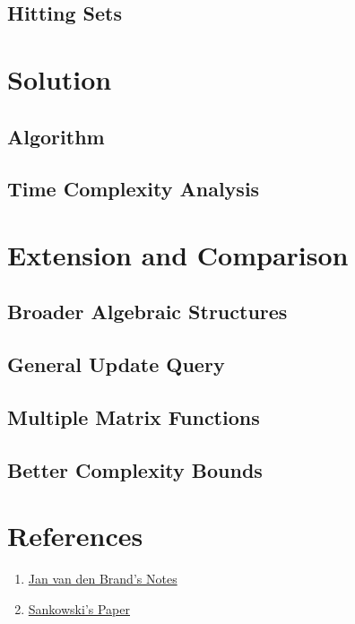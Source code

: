 \documentclass[12pt]{article}
\begin{document}
\subsection{Hitting Sets}

\section{Solution}
\subsection{Algorithm}
\subsection{Time Complexity Analysis}

\section{Extension and Comparison}
\subsection{Broader Algebraic Structures}
\subsection{General Update Query}
\subsection{Multiple Matrix Functions}
\subsection{Better Complexity Bounds}

\section*{References}

\begin{enumerate}
    \item \href{https://www.dropbox.com/scl/fi/zjfbk8dbxbzcn05dr8l11/fall22_daa_lecturenotes.pdf?rlkey=g6z7z1hvj7jknvlpy1s3dqcjw&e=1&st=13r18doq&dl=0}{Jan van den Brand's Notes}
    \item \href{https://www.dropbox.com/scl/fi/5w4k0lg0u8e36zugapp6c/Sankowski-COCOON-05-subquadratic-dynamic-distances.pdf?rlkey=5eahwsl7a49kwxyvlr7yqyoz3&e=2&st=d3zo7owc&dl=0}{Sankowski's Paper}
\end{enumerate}
\end{document}
